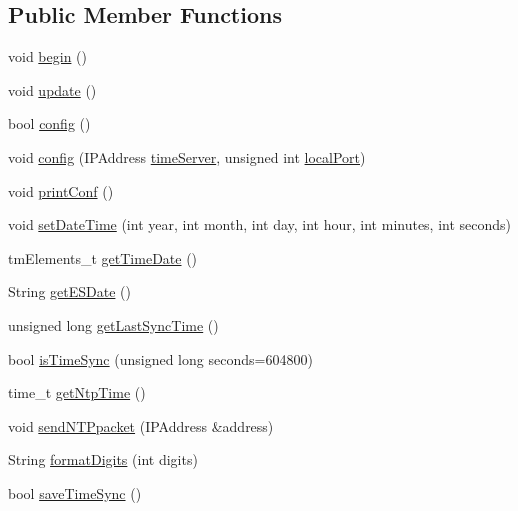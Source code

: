 \subsection*{Public Member Functions}
\begin{DoxyCompactItemize}
\item 
void \hyperlink{class_cool_time_ab1976cf718b950bc31e003c3323b8adb}{begin} ()
\item 
void \hyperlink{class_cool_time_aae601f795452cfa48d9fb337aed483a8}{update} ()
\item 
bool \hyperlink{class_cool_time_a87c28260c1bc77091162cbcf1ee2e129}{config} ()
\item 
void \hyperlink{class_cool_time_a014656d0d3f74d6391364b92b13e0780}{config} (I\+P\+Address \hyperlink{class_cool_time_ad2b9858f399108cb440dd1e908916f04}{time\+Server}, unsigned int \hyperlink{class_cool_time_a2f777da44d7ba678be8185299e9b49d1}{local\+Port})
\item 
void \hyperlink{class_cool_time_af355e7f9b3898211cd2ff25eab5933b1}{print\+Conf} ()
\item 
void \hyperlink{class_cool_time_ab81ea7fdaace111aa01cc1ec84c6d297}{set\+Date\+Time} (int year, int month, int day, int hour, int minutes, int seconds)
\item 
tm\+Elements\+\_\+t \hyperlink{class_cool_time_a7a7501c5ca77dd1248bea704c44f986c}{get\+Time\+Date} ()
\item 
String \hyperlink{class_cool_time_ac4f32ee513c1328d984306645e8785a4}{get\+E\+S\+Date} ()
\item 
unsigned long \hyperlink{class_cool_time_a5d17f707a9d337720493b2bce9d41c21}{get\+Last\+Sync\+Time} ()
\item 
bool \hyperlink{class_cool_time_a5ae038a4498602b189f76a10bf02adf8}{is\+Time\+Sync} (unsigned long seconds=604800)
\item 
time\+\_\+t \hyperlink{class_cool_time_a41fbbbfd651c2079f54d4b2911e4c705}{get\+Ntp\+Time} ()
\item 
void \hyperlink{class_cool_time_a236a38d120dc53bc67456d763838c5a1}{send\+N\+T\+Ppacket} (I\+P\+Address \&address)
\item 
String \hyperlink{class_cool_time_acd537cd4210d7bde4e1f5c47d2ac0456}{format\+Digits} (int digits)
\item 
bool \hyperlink{class_cool_time_ae9658c9b377510d469e3b88edf33ee85}{save\+Time\+Sync} ()
\end{DoxyCompactItemize}
